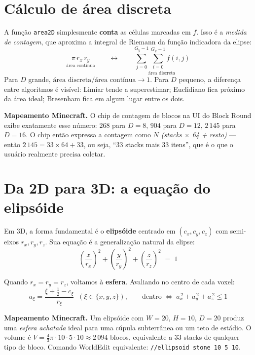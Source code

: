 \documentclass[12pt,a4paper]{scrartcl}
\newcommand{\code}[1]{\texttt{\small #1}}
\newcommand{\acc}[1]{\textcolor{accent}{\textbf{#1}}}
\newcommand{\cmd}[1]{\textcolor{earth}{\texttt{\small #1}}}
\begin{document}
\section{Cálculo de área discreta}

A função \code{area2D} simplesmente \acc{conta} as células marcadas em $f$. Isso é a \emph{medida de contagem}, que aproxima a integral de Riemann da função indicadora da elipse:
\[
\underset{\text{área contínua}}{\pi \, r_x \, r_y}
\qquad\longleftrightarrow\qquad
\underset{\text{área discreta}}{\sum_{j=0}^{G_y-1}\sum_{i=0}^{G_x-1} f(i,j)}
\]
Para $D$ grande, $\text{área discreta} / \text{área contínua} \to 1$. Para $D$ pequeno, a diferença entre algoritmos é visível: Limiar tende a superestimar; Euclidiano fica próximo da área ideal; Bresenham fica em algum lugar entre os dois.

\begin{minec}
\textbf{Mapeamento Minecraft.} O chip de contagem de blocos na UI do Block Round exibe exatamente esse número: $268$ para $D=8$, $904$ para $D=12$, $2\,145$ para $D=16$. O chip então expressa a contagem como \emph{$N$ (stacks $\times$ 64 + resto)} --- então $2\,145 = 33 \times 64 + 33$, ou seja, \enquote{$33$ stacks mais $33$ itens}, que é o que o usuário realmente precisa coletar.
\end{minec}

\section{Da 2D para 3D: a equação do elipsóide}

Em 3D, a forma fundamental é o \acc{elipsóide} centrado em $(c_x, c_y, c_z)$ com semi-eixos $r_x, r_y, r_z$. Sua equação é a generalização natural da elipse:
\[
\left(\dfrac{x}{r_x}\right)^{\!2} + \left(\dfrac{y}{r_y}\right)^{\!2} + \left(\dfrac{z}{r_z}\right)^{\!2} \;=\; 1
\]

Quando $r_x = r_y = r_z$, voltamos à \acc{esfera}. Avaliando no centro de cada voxel:
\[
a_\xi = \frac{\xi + \tfrac{1}{2} - c_\xi}{r_\xi}\;\;(\xi \in \{x,y,z\}),
\qquad
\text{dentro}\;\Longleftrightarrow\;a_x^{\,2} + a_y^{\,2} + a_z^{\,2} \leq 1
\]

\begin{minec}
\textbf{Mapeamento Minecraft.} Um elipsóide com $W=20$, $H=10$, $D=20$ produz uma \emph{esfera achatada} ideal para uma cúpula subterrânea ou um teto de estádio. O volume é $V = \tfrac{4}{3}\pi \cdot 10 \cdot 5 \cdot 10 \approx 2\,094$ blocos, equivalente a $33$ stacks de qualquer tipo de bloco. Comando WorldEdit equivalente: \cmd{//ellipsoid stone 10 5 10}.
\end{minec}
\end{document}
